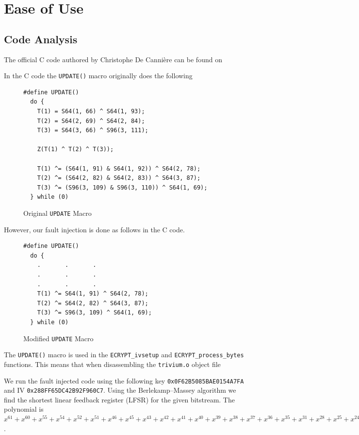 \documentclass[conference]{IEEEtran}
\newcommand{\code}[1]{\texttt{#1}}
\begin{document}
\section{Ease of Use}

\subsection{Code Analysis}
The official C code authored by Christophe De Canni\`ere can be found on  

In the C code the \code{UPDATE()} macro originally does the following
\begin{figure}
\begin{lstlisting}[style=snippet, frame=tlrb]
#define UPDATE()
  do { 
    T(1) = S64(1, 66) ^ S64(1, 93);
    T(2) = S64(2, 69) ^ S64(2, 84);
    T(3) = S64(3, 66) ^ S96(3, 111);

    Z(T(1) ^ T(2) ^ T(3));

    T(1) ^= (S64(1, 91) & S64(1, 92)) ^ S64(2, 78); 
    T(2) ^= (S64(2, 82) & S64(2, 83)) ^ S64(3, 87); 
    T(3) ^= (S96(3, 109) & S96(3, 110)) ^ S64(1, 69); 
  } while (0)
\end{lstlisting}
\caption{Original \code{UPDATE} Macro}
\end{figure}

However, our fault injection is done as follows in the C code.
\begin{figure}
\begin{lstlisting}[style=snippet, frame=tlrb]
#define UPDATE()
  do {
    .       .       .
    .       .       .
    .       .       .
    T(1) ^= S64(1, 91) ^ S64(2, 78); 
    T(2) ^= S64(2, 82) ^ S64(3, 87); 
    T(3) ^= S96(3, 109) ^ S64(1, 69); 
  } while (0)
\end{lstlisting}
\caption{Modified \code{UPDATE} Macro}
\end{figure}















The \code{UPDATE()} macro is used in the \code{ECRYPT\_ivsetup} and \code{ECRYPT\_process\_bytes} functions. This means that when disassembling the \code{trivium.o} object file 

We run the fault injected code using the following key \code{0x0F62B5085BAE0154A7FA} and IV \code{0x288FF65DC42B92F960C7}. Using the Berlekamp–Massey algorithm \cite{massey} we find the shortest linear feedback register (LFSR) for the given bitstream. The polynomial is
$x^{61} + x^{60} + x^{55} + x^{54} + x^{52} + x^{51} + x^{46} + x^{45} + x^{43} + x^{42} + x^{41} + x^{40} + x^{39} + x^{38} + x^{37} + x^{36} + x^{35} + x^{31} + x^{28} + x^{25} + x^{24} + x^{23} + x^{20} + x^{19} + x^{18} + x^{11} + x^8 + x^7 + 1$.
\end{document}
